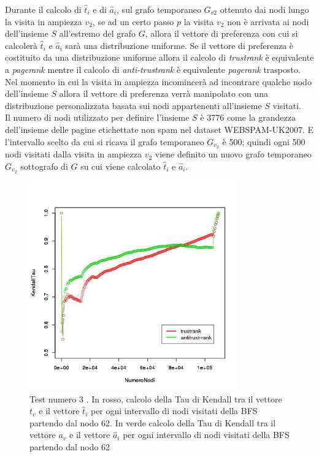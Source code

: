 Durante il calcolo di \(\hat{t}_i\) e di \(\hat{a}_i\), sul grafo temporaneo \(G_{v2}\) ottenuto dai nodi lungo la visita in ampiezza \(v_2\), se ad un certo passo \(p\) la visita \(v_2\) non  è arrivata ai nodi dell'insieme \(S\) all'estremo del grafo \(G\), allora il vettore di preferenza con cui si calcolerà \(\hat{t}_i\) e \(\hat{a}_i\) sarà una distribuzione uniforme. Se il vettore di preferenza è costituito da una distribuzione uniforme allora il calcolo di \textit{trustrank} è equivalente a \textit{pagerank} mentre il calcolo di \textit{anti-trustrank} è equivalente \textit{pagerank} trasposto. Nel momento in cui la visita in ampiezza incomincerà ad incontrare qualche nodo dell'insieme \(S\) allora il vettore di preferenza verrà manipolato con una distribuzione personalizzata basata sui nodi appartenenti all'insieme \(S\) visitati. \\
Il numero di  nodi utilizzato per definire l'insieme \(S\) è 3776 come la grandezza dell'insieme delle pagine etichettate non spam nel dataset WEBSPAM-UK2007. E l'intervallo scelto da cui si ricava il grafo temporaneo \(G_{v_2}\) è 500; quindi ogni 500 nodi visitati dalla visita in ampiezza \(v_2\) viene definito un nuovo grafo temporaneo \(G_{v_2}\) sottografo di \(G\) su cui viene calcolato \(\hat{t}_i\) e \(\hat{a}_i\).
\begin{figure}
\centering
 \includegraphics[height=9cm]{immagini/test3/coplotTrustAnti_Mode1_set3776_62}
 \caption{Test numero 3 . In rosso, calcolo della Tau di Kendall  tra il vettore $t_v$ e il vettore $\hat{t}_i$ per ogni intervallo di nodi visitati della BFS partendo dal nodo 62. In verde calcolo della Tau di Kendall tra il vettore $a_v$ e il vettore $\hat{a}_i$ per ogni intervallo di nodi visitati della BFS partendo dal nodo 62}
 \label{fig:test3coplotTrustAntiModeB62}
\end{figure}

